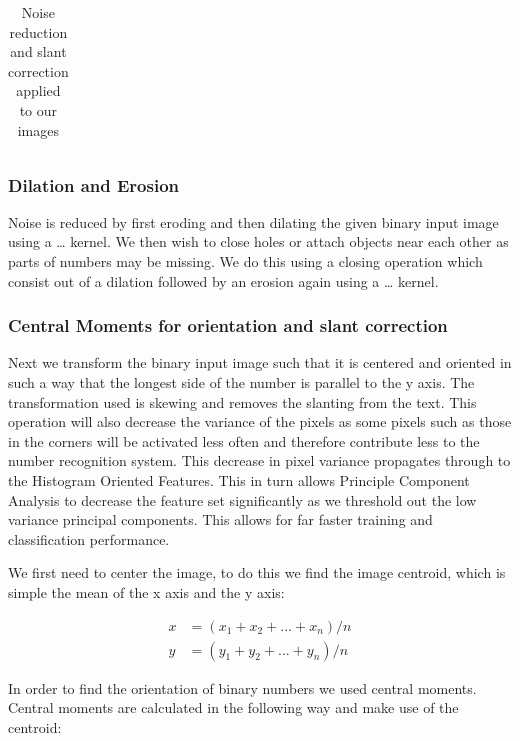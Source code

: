 \documentclass[%
        compressed,
        final,
        notitlepage,
        narroweqnarray,
        inline,
        twoside,
        ]{ieee}
\begin{document}
\begin{table}
\begin{tabular}{|c|c|}
        \hline
    \end{tabular}
    \caption{Noise reduction and slant correction applied to our images}
\end{table}

\subsubsection{Dilation and Erosion}
Noise is reduced by first eroding and then dilating the given binary input image using a … kernel. We then wish to close holes or attach objects near each other as parts of numbers may be missing. We do this using a closing operation which consist out of a dilation followed by an erosion again using a … kernel.

\subsubsection{Central Moments for orientation and slant correction}
Next we transform the binary input image such that it is centered and oriented in such a way that the longest side of the number is parallel to the y axis. The transformation used is skewing and removes the slanting from the text. This operation will also decrease the variance of the pixels as some pixels such as those in the corners will be activated less often and therefore contribute less to the number recognition system. This decrease in pixel variance propagates through to the Histogram Oriented Features. This in turn allows Principle Component Analysis to decrease the feature set significantly as we threshold out the low variance principal components. This allows for far faster training and classification performance.

We first need to center the image, to do this we find the image centroid, which is simple the mean of the x axis and the y axis:

\begin{align}
    x&=(x_1+x_2+...+x_n)/n \\
    y&=(y_1+y_2+...+y_n)/n
\end{align}

In order to find the orientation of binary numbers we used central moments. Central moments are calculated in the following way and make use of the centroid:
\end{document}
